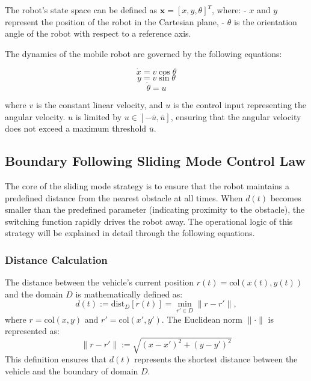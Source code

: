 The robot's state space can be defined as \( \mathbf{x} = [x, y, \theta]^T \), where:
- \( x \) and \( y \) represent the position of the robot in the Cartesian plane,
- \( \theta \) is the orientation angle of the robot with respect to a reference axis.

The dynamics of the mobile robot are governed by the following equations:

\begin{equation}
\dot{x} = v \cos \theta
\end{equation}
\begin{equation}
\dot{y} = v \sin \theta
\end{equation}
\begin{equation}
\dot{\theta} = u
\end{equation}

where \( v \) is the constant linear velocity, and \( u \) is the control input representing the angular velocity. \( u \) is limited by \( u \in [-\bar{u}, \bar{u}] \), ensuring that the angular velocity does not exceed a maximum threshold \( \bar{u} \).

\subsection{Boundary Following Sliding Mode Control Law}

The core of the sliding mode strategy is to ensure that the robot maintains a predefined distance from the nearest obstacle at all times. When \( d(t) \) becomes smaller than the predefined parameter (indicating proximity to the obstacle), the switching function rapidly drives the robot away. The operational logic of this strategy will be explained in detail through the following equations.

\subsubsection*{Distance Calculation}
The distance between the vehicle's current position \(r(t) = \text{col}(x(t), y(t))\) and the domain \(D\) is mathematically defined as:
\[
d(t) := \text{dist}_D[r(t)] = \min_{r' \in D} \|r - r'\|,
\]
where \(r = \text{col}(x, y)\) and \(r' = \text{col}(x', y')\). The Euclidean norm \(\|\cdot\|\) is represented as:
\begin{equation}
\| r - r' \| := \sqrt{(x - x')^2 + (y - y')^2}
\label{eq:euclidean_norm}
\end{equation}
This definition ensures that \( d(t) \) represents the shortest distance between the vehicle and the boundary of domain \( D \).

